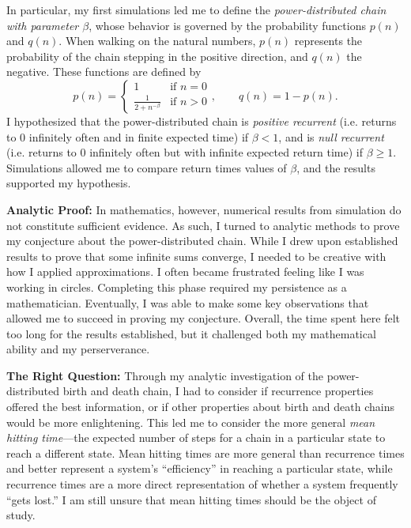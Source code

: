 \documentclass[12pt,letterpaper]{article}
\begin{document}
In particular, my first simulations led me to define the \emph{power-distributed chain with parameter
$\beta$}, whose behavior is governed by the probability functions $p(n)$ and $q(n)$. When walking on the
natural numbers, $p(n)$ represents the probability of the chain stepping in the positive direction, and
$q(n)$ the negative. These functions are defined by
\[
    p(n) = \begin{cases}
        1 & \text{if } n = 0 \\
        \frac{1}{2+n^{-\beta}} & \text{if } n > 0
    \end{cases}, \quad \quad
    q(n) = 1-p(n).
\]
I hypothesized that the power-distributed chain is \emph{positive recurrent} (i.e. returns to $0$
infinitely often and in finite expected time) if $\beta < 1$, and is \emph{null recurrent} (i.e.
returns to $0$ infinitely often but with infinite expected return time) if $\beta \geq 1$. Simulations
allowed me to compare return times values of $\beta$, and the results supported my hypothesis.

\noindent
\textbf{Analytic Proof:} In mathematics, however, numerical results from simulation do not constitute
sufficient evidence. As such, I turned to analytic methods to prove my conjecture about the
power-distributed chain. While I drew upon established results to prove that some infinite sums
converge, I needed to be creative with how I applied approximations. I often became frustrated feeling
like I was working in circles. Completing this phase required my persistence as a mathematician.
Eventually, I was able to make some key observations that allowed me to succeed in proving my
conjecture.  Overall, the time spent here felt too long for the results established, but it challenged
both my mathematical ability and my perserverance.

\noindent \textbf{The Right Question:} Through my analytic investigation of the power-distributed birth
and death chain, I had to consider if recurrence properties offered the best information, or if other
properties about birth and death chains would be more enlightening. This led me to consider the more
general \emph{mean hitting time}---the expected number of steps for a chain in a particular state to
reach a different state. Mean hitting times are more general than recurrence times and better represent
a system's ``efficiency'' in reaching a particular state, while recurrence times are a more direct
representation of whether a system frequently ``gets lost.'' I am still unsure that mean hitting times
should be the object of study.
\end{document}
